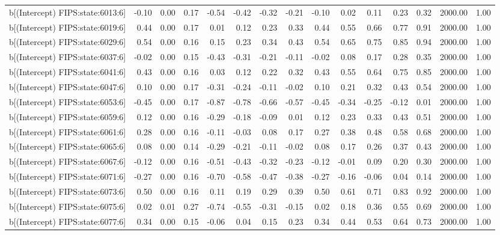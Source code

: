 \begin{table}[ht]
\begin{tabular}{rrrrrrrrrrrrrrr}
  b[(Intercept) FIPS:state:6013:6] & -0.10 & 0.00 & 0.17 & -0.54 & -0.42 & -0.32 & -0.21 & -0.10 & 0.02 & 0.11 & 0.23 & 0.32 & 2000.00 & 1.00 \\ 
  b[(Intercept) FIPS:state:6019:6] & 0.44 & 0.00 & 0.17 & 0.01 & 0.12 & 0.23 & 0.33 & 0.44 & 0.55 & 0.66 & 0.77 & 0.91 & 2000.00 & 1.00 \\ 
  b[(Intercept) FIPS:state:6029:6] & 0.54 & 0.00 & 0.16 & 0.15 & 0.23 & 0.34 & 0.43 & 0.54 & 0.65 & 0.75 & 0.85 & 0.94 & 2000.00 & 1.00 \\ 
  b[(Intercept) FIPS:state:6037:6] & -0.02 & 0.00 & 0.15 & -0.43 & -0.31 & -0.21 & -0.11 & -0.02 & 0.08 & 0.17 & 0.28 & 0.35 & 2000.00 & 1.00 \\ 
  b[(Intercept) FIPS:state:6041:6] & 0.43 & 0.00 & 0.16 & 0.03 & 0.12 & 0.22 & 0.32 & 0.43 & 0.55 & 0.64 & 0.75 & 0.85 & 2000.00 & 1.00 \\ 
  b[(Intercept) FIPS:state:6047:6] & 0.10 & 0.00 & 0.17 & -0.31 & -0.24 & -0.11 & -0.02 & 0.10 & 0.21 & 0.32 & 0.43 & 0.54 & 2000.00 & 1.00 \\ 
  b[(Intercept) FIPS:state:6053:6] & -0.45 & 0.00 & 0.17 & -0.87 & -0.78 & -0.66 & -0.57 & -0.45 & -0.34 & -0.25 & -0.12 & 0.01 & 2000.00 & 1.00 \\ 
  b[(Intercept) FIPS:state:6059:6] & 0.12 & 0.00 & 0.16 & -0.29 & -0.18 & -0.09 & 0.01 & 0.12 & 0.23 & 0.33 & 0.43 & 0.51 & 2000.00 & 1.00 \\ 
  b[(Intercept) FIPS:state:6061:6] & 0.28 & 0.00 & 0.16 & -0.11 & -0.03 & 0.08 & 0.17 & 0.27 & 0.38 & 0.48 & 0.58 & 0.68 & 2000.00 & 1.00 \\ 
  b[(Intercept) FIPS:state:6065:6] & 0.08 & 0.00 & 0.14 & -0.29 & -0.21 & -0.11 & -0.02 & 0.08 & 0.17 & 0.26 & 0.37 & 0.43 & 2000.00 & 1.00 \\ 
  b[(Intercept) FIPS:state:6067:6] & -0.12 & 0.00 & 0.16 & -0.51 & -0.43 & -0.32 & -0.23 & -0.12 & -0.01 & 0.09 & 0.20 & 0.30 & 2000.00 & 1.00 \\ 
  b[(Intercept) FIPS:state:6071:6] & -0.27 & 0.00 & 0.16 & -0.70 & -0.58 & -0.47 & -0.38 & -0.27 & -0.16 & -0.06 & 0.04 & 0.14 & 2000.00 & 1.00 \\ 
  b[(Intercept) FIPS:state:6073:6] & 0.50 & 0.00 & 0.16 & 0.11 & 0.19 & 0.29 & 0.39 & 0.50 & 0.61 & 0.71 & 0.83 & 0.92 & 2000.00 & 1.00 \\ 
  b[(Intercept) FIPS:state:6075:6] & 0.02 & 0.01 & 0.27 & -0.74 & -0.55 & -0.31 & -0.15 & 0.02 & 0.18 & 0.36 & 0.55 & 0.69 & 2000.00 & 1.00 \\ 
  b[(Intercept) FIPS:state:6077:6] & 0.34 & 0.00 & 0.15 & -0.06 & 0.04 & 0.15 & 0.23 & 0.34 & 0.44 & 0.53 & 0.64 & 0.73 & 2000.00 & 1.00 \\ 

\end{tabular}
\end{table}
